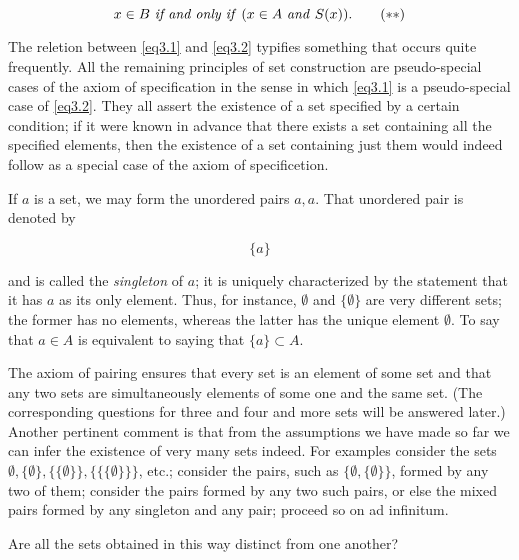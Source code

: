 \begin{equation}
\label{eq3.2}
x \in B \text{ \textit{if and only if} } (x \in A \text{ \textit{and} }  S(x)). \tag{$\ast \ast$}
\end{equation}

The reletion between \eqref{eq3.1} and \eqref{eq3.2} typifies something that occurs quite frequently. All the remaining principles of set construction are pseudo-special cases of the axiom of specification in the sense in which \eqref{eq3.1} is a pseudo-special case of \eqref{eq3.2}. They all assert the existence of a set specified by a certain condition; if it were known in advance that there exists a set containing all the specified elements, then the existence of a set containing just them would indeed follow as a special case of the axiom of specificetion. 

If $a$ is a set, we may form the unordered pairs ${a, a}$. That unordered pair is denoted by 

\begin{equation*}
\{ a \}
\end{equation*}

and is called the \textit{singleton} of $a$; it is uniquely characterized by the statement that it has $a$ as its only element. Thus, for instance, $ \emptyset $ and $ \{ \emptyset \}$ are very different sets; the former has no elements, whereas the latter has the unique element $ \emptyset $. To say that $a \in A$ is equivalent to saying that $\{a\} \subset A$. 

The axiom of pairing ensures that every set is an element of some set and that any two sets are simultaneously elements of some one and the same set. (The corresponding questions for three and four and more sets will be answered later.) Another pertinent comment is that from the assumptions we have made so far we can infer the existence of very many sets indeed. For examples  consider the sets $ \emptyset, \{ \emptyset \}, \{ \{ \emptyset \} \}, \{ \{ \{ \emptyset \} \} \} $, etc.; consider the pairs, such as  $ \{ \emptyset, \{ \emptyset \} \}$, formed by any two of them; consider the pairs formed by any two such pairs, or else the mixed pairs formed by any singleton and any pair; proceed so on ad infinitum.

\begin{exercise} Are all the sets obtained in this way distinct from one another? 
\end{exercise}

